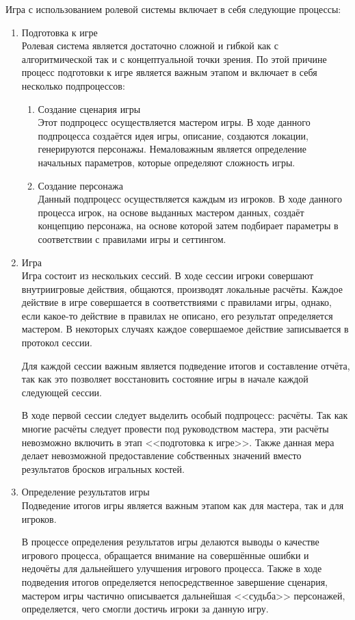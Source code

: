 Игра с использованием ролевой системы \dnd включает в себя следующие процессы:
\begin{enumerate}
\item Подготовка к игре\\
Ролевая система \dnd является достаточно сложной и гибкой как с алгоритмической так и с концептуальной точки зрения. По этой причине процесс подготовки к игре является важным этапом и включает в себя несколько подпроцессов:
\begin{enumerate}
\item Создание сценария игры\\
Этот подпроцесс осуществляется мастером игры. В ходе данного подпроцесса создаётся идея игры, описание, создаются локации, генерируются персонажы. Немаловажным является определение начальных параметров, которые определяют сложность игры.
\item Создание персонажа\\
Данный подпроцесс осуществляется каждым из игроков. В ходе данного процесса игрок, на основе выданных мастером данных, создаёт концепцию персонажа, на основе которой затем подбирает параметры в соответствии с правилами игры и сеттингом.
\end{enumerate}
\item Игра\\
Игра состоит из нескольких сессий. В ходе сессии игроки совершают внутриигровые действия, общаются, производят локальные расчёты. Каждое действие в игре совершается в соответствиями с правилами игры, однако, если какое-то действие в правилах не описано, его результат определяется мастером. В некоторых случаях каждое совершаемое действие записывается в протокол сессии.

Для каждой сессии важным является подведение итогов и составление отчёта, так как это позволяет восстановить состояние игры в начале каждой следующей сессии.

В ходе первой сессии следует выделить особый подпроцесс: расчёты. Так как многие расчёты следует провести под руководством мастера, эти расчёты невозможно включить в этап <<подготовка к игре>>. Также данная мера делает невозможной предоставление собственных значений вместо результатов бросков игральных костей.
\item Определение результатов игры\\
Подведение итогов игры является важным этапом как для мастера, так и для игроков.

В процессе определения результатов игры делаются выводы о качестве игрового процесса, обращается внимание на совершённые ошибки и недочёты для дальнейшего улучшения игрового процесса. Также в ходе подведения итогов определяется непосредственное завершение сценария, мастером игры частично описывается дальнейшая <<судьба>> персонажей, определяется, чего смогли достичь игроки за данную игру.


\end{enumerate}
